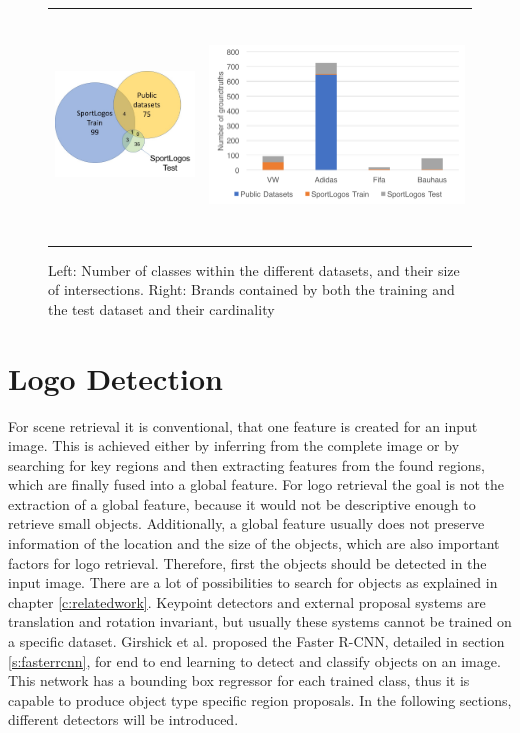 \begin{figure}
  \centering
\begin{tabular}{cc}
  \includegraphics[height=40mm]{images/mt/brandintersections.jpg} &   \includegraphics[height=60mm]{images/mt/commonbrands.png}
\end{tabular}
\caption{Left: Number of classes within the different datasets, and their size of intersections. Right: Brands contained by both the training and the test dataset and their cardinality}
\label{f:commonbrands}
\end{figure}
\section{Logo Detection}\label{s:logodetection}
For scene retrieval it is conventional, that one feature is created for an input image. This is achieved either by inferring from the complete image or by searching for key regions and then extracting features from the found regions, which are finally fused into a global feature. For logo retrieval the goal is not the extraction of a global feature, because it would not be descriptive enough to retrieve small objects. Additionally, a global feature usually does not preserve information of the location and the size of the objects, which are also important factors for logo retrieval.
\bigbreak
Therefore, first the objects should be detected in the input image. There are a lot of possibilities to search for objects as explained in chapter \ref{c:relatedwork}. Keypoint detectors and external proposal systems are translation and rotation invariant, but usually these systems cannot be trained on a specific dataset. Girshick et al. \cite{NIPS2015_5638} proposed the Faster R-CNN, detailed in section \ref{s:fasterrcnn}, for end to end learning to detect and classify objects on an image. This network has a bounding box regressor for each trained class, thus it is capable to produce object type specific region proposals.
\bigbreak
In the following sections, different detectors will be introduced.
\bigbreak
